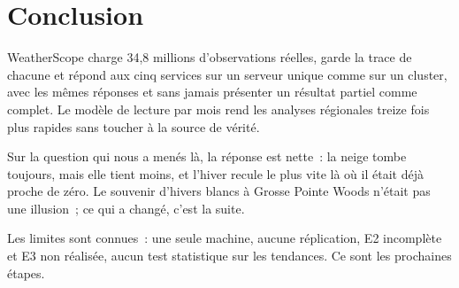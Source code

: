 \section{Conclusion}

WeatherScope charge 34,8 millions d'observations réelles, garde la trace de chacune et répond aux cinq services sur un serveur unique comme sur un cluster, avec les mêmes réponses et sans jamais présenter un résultat partiel comme complet. Le modèle de lecture par mois rend les analyses régionales treize fois plus rapides sans toucher à la source de vérité.

Sur la question qui nous a menés là, la réponse est nette~: la neige tombe toujours, mais elle tient moins, et l'hiver recule le plus vite là où il était déjà proche de zéro. Le souvenir d'hivers blancs à Grosse Pointe Woods n'était pas une illusion~; ce qui a changé, c'est la suite.

Les limites sont connues~: une seule machine, aucune réplication, E2 incomplète et E3 non réalisée, aucun test statistique sur les tendances. Ce sont les prochaines étapes.
